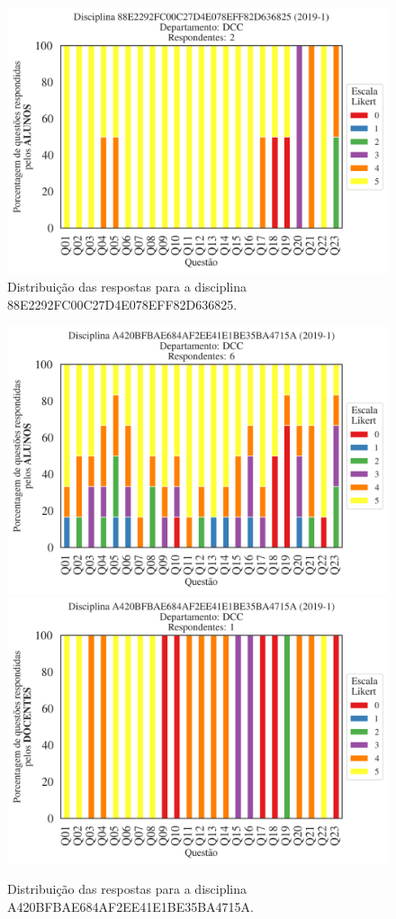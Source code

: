 \documentclass[a4paper,10pt]{article}
\begin{document}
\begin{figure}[h]
\centering
\includegraphics[width=0.485\linewidth]{analise_disciplina_departamento_DCC_ALUNO_TURMA_88E2292FC00C27D4E078EFF82D636825.png}
\caption{\label{fig:analise_geral_departamento}                Distribuição das respostas para a disciplina 88E2292FC00C27D4E078EFF82D636825.}
\end{figure}
\begin{figure}[h]
\centering
\includegraphics[width=0.485\linewidth]{analise_disciplina_departamento_DCC_ALUNO_TURMA_A420BFBAE684AF2EE41E1BE35BA4715A.png}
\includegraphics[width=0.485\linewidth]{analise_disciplina_departamento_DCC_DOCENTE_TURMA_A420BFBAE684AF2EE41E1BE35BA4715A.png}
\caption{\label{fig:analise_geral_departamento}                Distribuição das respostas para a disciplina A420BFBAE684AF2EE41E1BE35BA4715A.}
\end{figure}
\end{document}
